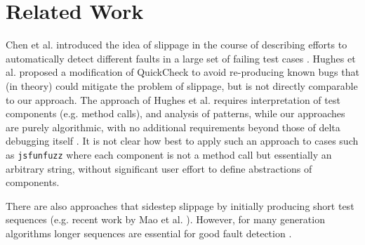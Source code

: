 \section{Related Work}

Chen et al. introduced the idea of slippage in the course of
describing efforts to automatically detect different faults in a large
set of failing test cases \cite{PLDI13}.  Hughes et
al. \cite{FindMoreBugs} proposed a modification of QuickCheck
to avoid re-producing known bugs that (in theory)
could mitigate the problem of slippage, but is not directly comparable
to our approach.  The approach of Hughes et al. requires
interpretation of test components (e.g. method calls), and analysis of
patterns, while our approaches are purely algorithmic, with no
additional requirements beyond those of delta debugging itself
\cite{DD}.  It is not clear how best to apply such an approach
 to cases such as {\tt jsfunfuzz} where each component is not a
method call but essentially an arbitrary string, without significant
user effort to define abstractions of components.

There are also approaches that sidestep slippage by initially
producing short test sequences (e.g. recent work by Mao et
al. \cite{Mao}).  However, for many generation algorithms
longer sequences are essential for good fault detection \cite{ASE08,LongBetter}.
